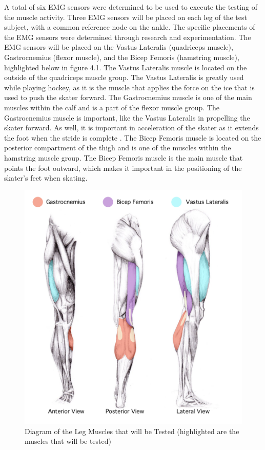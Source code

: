 A total of six EMG sensors were determined to be used to execute the testing of the muscle activity. Three EMG sensors will be placed on each leg of the test subject, with a common reference node on the ankle. The specific placements of the EMG sensors were determined through research and experimentation. The EMG sensors will be placed on the Vastus Lateralis (quadriceps muscle), Gastrocnemius (flexor muscle), and the Bicep Femoris (hamstring muscle), highlighted below in figure 4.1\cite{1}. The Vastus Lateralis  muscle is located on the outside of the quadriceps muscle group. The Vastus Lateralis is greatly used while playing hockey, as it is the muscle that applies the force on the ice that is used to push the skater forward\cite{2}. The Gastrocnemius muscle is one of the main muscles within the calf and is a part of the flexor muscle group. The Gastrocnemius muscle is important, like the Vastus Lateralis in propelling the skater forward. As well, it is important in acceleration of the skater as it extends the foot when the stride is complete \cite{2}. The Bicep Femoris muscle is located on the posterior compartment of the thigh and is one of the muscles within the hamstring muscle group. The Bicep Femoris muscle is the main muscle that points the foot outward, which makes it important in the positioning of the skater's feet when skating\cite{2}. 
\par
\begin{figure}[htb]
\centering
\includegraphics[scale=0.5]{Progress_Report/figs/highlightedmuscles.png}
\caption{Diagram of the Leg Muscles that will be Tested (highlighted are the muscles that will be tested)\cite{3}}
\label{fig:Muscles}
\end{figure}
\par


